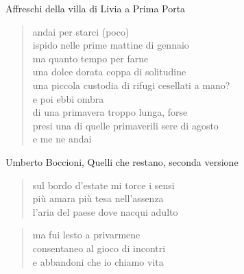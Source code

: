 \begin{volumetitlepage}
	\bigskip\bigskip\bigskip
\end{volumetitlepage}


\begin{artItem}
	Affreschi della villa di Livia a Prima Porta
\end{artItem}

	\begin{verse}
		andai per starci (poco)\\
		ispido nelle prime mattine di gennaio\\
		ma quanto tempo per farne\\
		una dolce dorata coppa di solitudine\\
		una piccola custodia di rifugi cesellati a mano?\\
		e poi ebbi ombra\\
		di una primavera troppo lunga, forse\\
		presi una di quelle primaverili sere di agosto\\
		e me ne andai
	\end{verse}

\clearpage


\begin{artItem}
	Umberto Boccioni, Quelli che restano, seconda versione
\end{artItem}

	\begin{verse}
		sul bordo d'estate mi torce i sensi\\
		più amara più tesa nell'assenza\\
		l'aria del paese dove nacqui adulto
	\end{verse}

	\begin{verse}
		ma fui lesto a privarmene\\
		consentaneo al gioco di incontri\\
		e abbandoni che io chiamo vita
	\end{verse}

\clearpage


